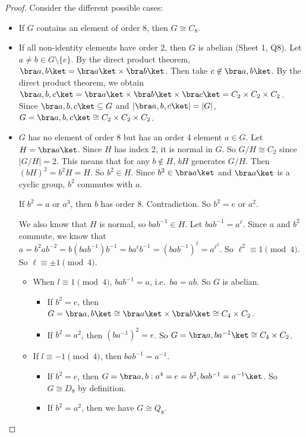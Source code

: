 \documentclass[a4paper]{article}
\begin{document}
\begin{proof}
  Consider the different possible cases:
  \begin{itemize}
    \item If $G$ contains an element of order 8, then $G\cong C_8$.
    \item If all non-identity elements have order 2, then $G$ is abelian (Sheet 1, Q8). Let $a\not= b\in G\setminus\{e\}$. By the direct product theorem, $\bra a, b\ket = \bra a\ket\times\bra b\ket$. Then take $c\not\in \bra a, b\ket$. By the direct product theorem, we obtain $\bra a, b, c\ket = \bra a\ket\times\bra b\ket\times\bra c\ket = C_2\times C_2\times C_2$. Since $\bra a, b, c\ket\subseteq G$ and $|\bra a, b, c\ket| = |G|$, $G = \bra a, b, c\ket \cong C_2\times C_2\times C_2$.
    \item $G$ has no element of order 8 but has an order 4 element $a\in G$. Let $H = \bra a\ket$. Since $H$ has index 2, it is normal in $G$. So $G/H \cong C_2$ since $|G/H| = 2$. This means that for any $b\not\in H$, $bH$ generates $G/H$. Then $(bH)^2 = b^2H = H$. So $b^2\in H$. Since $b^2\in \bra a\ket$ and $\bra a\ket$ is a cyclic group, $b^2$ commutes with $a$.

      If $b^2 = a$ or $a^3$, then $b$ has order 8. Contradiction. So $b^2 = e$ or $a^2$.

      We also know that $H$ is normal, so $bab^{-1}\in H$. Let $bab^{-1} = a^\ell$. Since $a$ and $b^2$ commute, we know that $a = b^2 ab^{-2} = b(bab^{-1})b^{-1} = ba^\ell b^{-1} = (bab^{-1})^{\ell} = a^{\ell^2}$. So $\ell^2 \equiv 1\pmod 4$. So $\ell \equiv \pm 1 \pmod 4$.

      \begin{itemize}
        \item When $l\equiv 1\pmod 4$, $bab^{-1} = a$, i.e.\ $ba = ab$. So $G$ is abelian.
          \begin{itemize}
            \item If $b^2 = e$, then $G = \bra a, b\ket \cong \bra a\ket \times \bra b\ket \cong C_4\times C_2$.
            \item If $b^2 = a^2$, then $(ba^{-1})^2 = e$. So $G = \bra a, ba^{-1}\ket \cong C_4\times C_2$.
          \end{itemize}
        \item If $l \equiv -1\pmod 4$, then $bab^{-1} = a^{-1}$.
          \begin{itemize}
            \item If $b^2 = e$, then $G = \bra a, b: a^4 = e = b^2, bab^{-1} = a^{-1}\ket$. So $G\cong D_8$ by definition.
            \item If $b^2 = a^2$, then we have $G\cong Q_8$.
          \end{itemize}
      \end{itemize}
  \end{itemize}
\end{proof}
\end{document}
